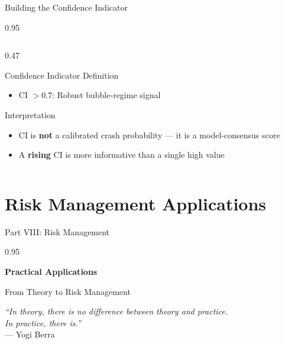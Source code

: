 \documentclass[9pt, aspectratio=169, t]{beamer}
\begin{document}
\begin{frame}{Building the Confidence Indicator}
\begin{cminipage}{0.95\textwidth}
{\begin{columns}[T]
\begin{column}{0.47\textwidth}
\begin{block}{Confidence Indicator Definition}
\begin{itemize}
                    \item CI $> 0.7$: Robust bubble-regime signal
                \end{itemize}
            \end{block}
            \vspace{-1mm}
            \begin{block}{Interpretation}
                \begin{itemize}\setlength{\itemsep}{0pt}
                    \item CI is \textbf{not} a calibrated crash probability --- it is a model-consensus score
                    \item A \textbf{rising} CI is more informative than a single high value
                \end{itemize}
            \end{block}
        \end{column}
    \end{columns}
    }
    \end{cminipage}
\end{frame}

\section{Risk Management Applications}

\begin{frame}{Part VIII: Risk Management}
    \begin{cminipage}{0.95\textwidth}
    \begin{center}
        {\LARGE\color{MainBlue}\textbf{Practical Applications}}

        \vspace{8mm}
        {\large From Theory to Risk Management}

        \vspace{8mm}
        \textit{``In theory, there is no difference between theory and practice.\\In practice, there is.''}\\
        --- Yogi Berra
    \end{center}
    \end{cminipage}
\end{frame}
\end{document}
